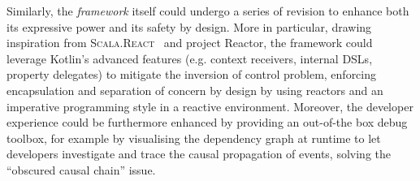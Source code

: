 Similarly, the \emph{framework} itself could undergo a series of revision to
enhance both its expressive power and its safety by design. More in particular,
drawing inspiration from \textsc{Scala.React}~\cite{maier2010DOP} and project
Reactor, the framework could leverage Kotlin's advanced features (e.g. context
receivers, internal DSLs, property delegates) to mitigate the inversion of
control problem, enforcing encapsulation and separation of concern by design by
using reactors and an imperative programming style in a reactive environment.
Moreover, the developer experience could be furthermore enhanced by providing
an out-of-the box debug toolbox, for example by visualising the dependency
graph at runtime to let developers investigate and trace the causal propagation
of events, solving the ``obscured causal chain'' issue.

